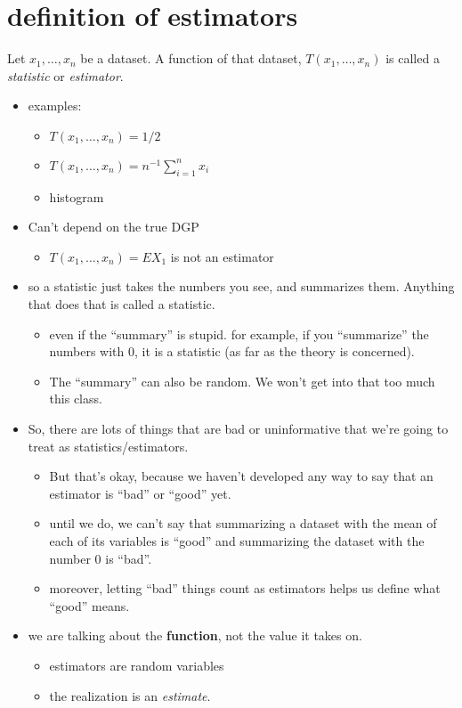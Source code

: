 \section{definition of estimators}

    Let $x_1,\dots,x_n$ be a dataset.  A function of that dataset,
    $T(x_1,\dots,x_n)$ is called a \emph{statistic} or \emph{estimator}.
\begin{itemize}
\item examples:
\begin{itemize}
\item $T(x_1,\dots,x_n) = 1/2$
\item $T(x_1,\dots,x_n) = n^{-1} \sum_{i=1}^n x_i$
\item histogram
\end{itemize}
\item Can't depend on the true DGP
\begin{itemize}
\item $T(x_1,\dots,x_n) = E X_1$ is not an estimator
\end{itemize}
\item so a statistic just takes the numbers you see, and summarizes
      them.  Anything that does that is called a statistic.
\begin{itemize}
\item even if the ``summary'' is stupid.  for example, if you
        ``summarize'' the numbers with 0, it is a statistic (as far as the
        theory is concerned).
\item The ``summary'' can also be random.  We won't get into that too
        much this class.
\end{itemize}
\item So, there are lots of things that are bad or uninformative that
      we're going to treat as statistics/estimators.
\begin{itemize}
\item But that's okay, because we haven't developed any way to say
        that an estimator is ``bad'' or ``good'' yet.
\item until we do, we can't say that summarizing a dataset with the
        mean of each of its variables is ``good'' and summarizing the
        dataset with the number 0 is ``bad''.
\item moreover, letting ``bad'' things count as estimators helps us
        define what ``good'' means.
\end{itemize}
\item we are talking about the \textbf{function}, not the value it takes on.
\begin{itemize}
\item estimators are random variables
\item the realization is an \emph{estimate}.
\end{itemize}
\end{itemize}

